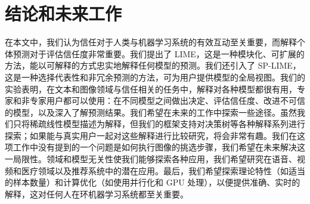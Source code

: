 \documentclass[12pt, a4paper]{ctexart} %
\begin{document}
\section {结论和未来工作}
在本文中，我们认为信任对于人类与机器学习系统的有效互动至关重要，而解释个体预测对于评估信任度非常重要。我们提出了 LIME，这是一种模块化、可扩展的方法，能以可解释的方式忠实地解释任何模型的预测。我们还引入了 SP-LIME，这是一种选择代表性和非冗余预测的方法，可为用户提供模型的全局视图。我们的实验表明，在文本和图像领域与信任相关的任务中，解释对各种模型都很有用，专家和非专家用户都可以使用：在不同模型之间做出决定、评估信任度、改进不可信的模型，以及深入了解预测结果。我们希望在未来的工作中探索一些途径。虽然我们只将稀疏线性模型描述为解释，但我们的框架支持对决策树等各种解释系列进行探索；如果能与真实用户一起对这些解释进行比较研究，将会非常有趣。我们在这项工作中没有提到的一个问题是如何执行图像的挑选步骤，我们希望在未来解决这一局限性。领域和模型无关性使我们能够探索各种应用，我们希望研究在语音、视频和医疗领域以及推荐系统中的潜在应用。最后，我们希望探索理论特性（如适当的样本数量）和计算优化（如使用并行化和 GPU 处理），以便提供准确、实时的解释，这对任何人在环机器学习系统都至关重要。
\end{document}
